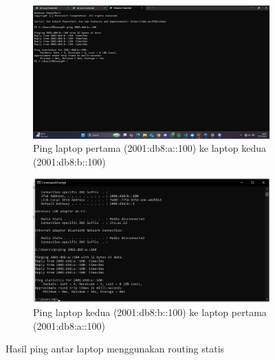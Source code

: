 \begin{figure}[H]
	\centering
	\begin{subfigure}[b]{0.4\linewidth}
		\centering
		\includegraphics[width=\linewidth]{P2/img/router 1 laptop 1 (6).jpg}
		\caption{Ping laptop pertama (2001:db8:a::100) ke laptop kedua (2001:db8:b::100)\label{fig:konfigurasiR1}}
	\end{subfigure}
	\begin{subfigure}[b]{0.4\linewidth}
		\centering
		\includegraphics[width=\linewidth]{P2/img/router2 laptop2 (4).jpg}
		\caption{Ping laptop kedua (2001:db8:b::100) ke laptop pertama (2001:db8:a::100)\label{fig:konfigurasiR2}}
	\end{subfigure}
	\caption{Hasil ping antar laptop menggunakan routing statis}
	\hspace{1cm}
\end{figure}

